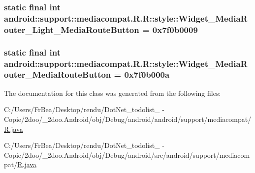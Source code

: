 \hypertarget{classandroid_1_1support_1_1mediacompat_1_1_r_1_1style_c2b743bdbaa7ba1d39f0d3f58a0b2033}{
\subsubsection[{Widget\_\-MediaRouter\_\-Light\_\-MediaRouteButton}]{\setlength{\rightskip}{0pt plus 5cm}static final int android::support::mediacompat.R.R::style::Widget\_\-MediaRouter\_\-Light\_\-MediaRouteButton = 0x7f0b0009}}
\label{classandroid_1_1support_1_1mediacompat_1_1_r_1_1style_c2b743bdbaa7ba1d39f0d3f58a0b2033}


\hypertarget{classandroid_1_1support_1_1mediacompat_1_1_r_1_1style_d65b9c0dfbde41d15707635419c1ebd8}{
\subsubsection[{Widget\_\-MediaRouter\_\-MediaRouteButton}]{\setlength{\rightskip}{0pt plus 5cm}static final int android::support::mediacompat.R.R::style::Widget\_\-MediaRouter\_\-MediaRouteButton = 0x7f0b000a}}
\label{classandroid_1_1support_1_1mediacompat_1_1_r_1_1style_d65b9c0dfbde41d15707635419c1ebd8}




The documentation for this class was generated from the following files:\begin{CompactItemize}
\item 
C:/Users/FrBea/Desktop/rendu/DotNet\_\-todolist\_ - Copie/2doo/\_\-2doo.Android/obj/Debug/android/android/support/mediacompat/\hyperlink{android_2support_2mediacompat_2_r_8java}{R.java}\item 
C:/Users/FrBea/Desktop/rendu/DotNet\_\-todolist\_ - Copie/2doo/\_\-2doo.Android/obj/Debug/android/src/android/support/mediacompat/\hyperlink{src_2android_2support_2mediacompat_2_r_8java}{R.java}\end{CompactItemize}
